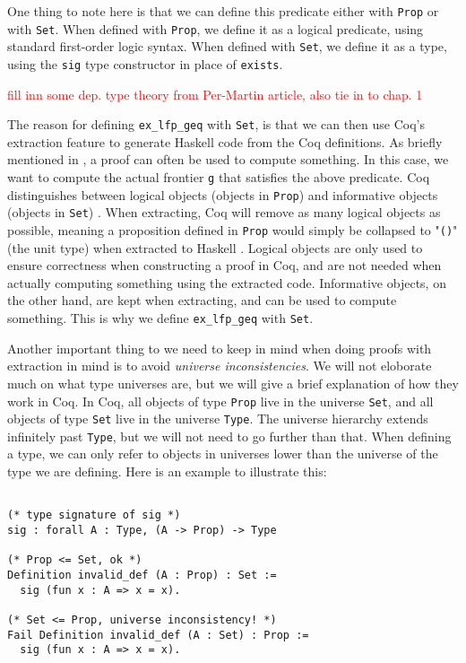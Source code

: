 One thing to note here is that we can define this predicate either with \lstinline{Prop} or with \lstinline{Set}.
When defined with \lstinline{Prop}, we define it as a logical predicate, using standard first-order logic syntax.
When defined with \lstinline{Set}, we define it as a type,
using the \lstinline{sig} type constructor in place of \lstinline{exists}.

\textcolor{red}{fill inn some dep. type theory from Per-Martin article, also tie in to chap. 1}

The reason for defining \lstinline{ex_lfp_geq} with \lstinline{Set}, is that we can then use
Coq's extraction feature to generate Haskell code from the Coq definitions.
As briefly mentioned in , a proof can often be used to compute something.
In this case, we want to compute the actual frontier \lstinline{g} that satisfies the above predicate.
Coq distinguishes between logical objects (objects in \lstinline{Prop}) and informative objects (objects in \lstinline{Set})
\cite[p.~1-2]{coqextrnew}.
When extracting, Coq will remove as many logical objects as possible, meaning a proposition defined in \lstinline{Prop}
would simply be collapsed to "\lstinline[language=Haskell]{()}" (the unit type) when extracted to Haskell
\cite[p.~8]{coqextroverview}.
Logical objects are only used to ensure correctness when constructing a proof in Coq,
and are not needed when actually computing something using the extracted code.
Informative objects, on the other hand, are kept when extracting, and can be used to compute something.
This is why we define \lstinline{ex_lfp_geq} with \lstinline{Set}.

Another important thing to we need to keep in mind when doing proofs with extraction in mind is to avoid \textit{universe inconsistencies}.
We will not eloborate much on what type universes are, but we will give a brief explanation of how they work in Coq.
In Coq, all objects of type \lstinline{Prop} live in the universe \lstinline{Set}, and all objects of type \lstinline{Set}
live in the universe \lstinline{Type}. The universe hierarchy extends infinitely past \lstinline{Type}, but we will not
need to go further than that.
When defining a type, we can only refer to objects in universes lower than the universe of the type we are defining.
Here is an example to illustrate this:

\begin{minipage}{\linewidth}
\begin{lstlisting}[language=Coq, label={lst:universe_inconsistency}, caption={A universe inconsistency in Coq}]

(* type signature of sig *)
sig : forall A : Type, (A -> Prop) -> Type

(* Prop <= Set, ok *)
Definition invalid_def (A : Prop) : Set :=
  sig (fun x : A => x = x).

(* Set <= Prop, universe inconsistency! *)
Fail Definition invalid_def (A : Set) : Prop :=
  sig (fun x : A => x = x).
\end{lstlisting}
\end{minipage}


